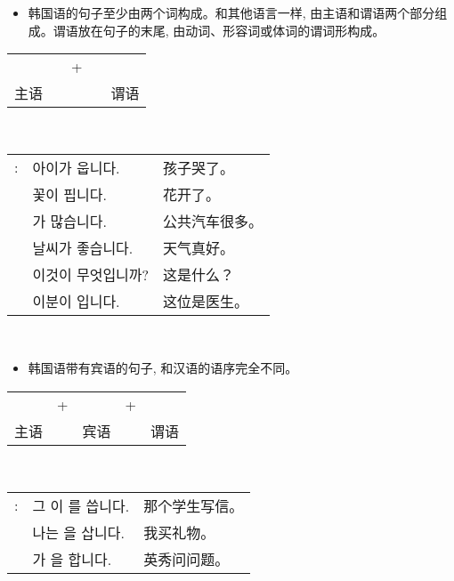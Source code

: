 \begin{grammar}
	\begin{grammarsect}[句子结构]
		\begin{itemize}
			\item 韩国语的句子至少由两个词构成。和其他语言一样, 由主语和谓语两个部分组成。谓语放在句子的末尾, 由动词、形容词或体词的谓词形构成。
		\end{itemize}
		\begin{center}
			\begin{tabular}{lllll}
				\kr \ruby{主語}{주어} & \qquad & + & \qquad & \kr \ruby{敍述語}{서술어} \\
				主语                & \qquad &   & \qquad & 谓语
			\end{tabular}\\
		\end{center}
		\begin{tabular}{lll}
			\kr \ruby{例}{예}: & \kr 아이가 웁니다.              & 孩子哭了。   \\
			                 & \kr 꽃이 핍니다.               & 花开了。    \\
			                 & \kr \ruby{버스}{bus}가 많습니다. & 公共汽车很多。 \\
			                 & \kr 날씨가 좋습니다.             & 天气真好。   \\
			                 & \kr 이것이 무엇입니까?            & 这是什么？   \\
			                 & \kr 이분이 \ruby{醫師}{의사}입니다. & 这位是医生。
		\end{tabular}\\
	\end{grammarsect}
	\begin{itemize}
		\item 韩国语带有宾语的句子, 和汉语的语序完全不同。
	\end{itemize}
	\begin{center}
		\begin{tabular}{lllll}
			\kr \ruby{主語}{주어} & + & \kr \ruby{目的語}{목적어} & + & \kr \ruby{敍述語}{서술어} \\
			主语                &   & 宾语                  &   & 谓语
		\end{tabular}\\
	\end{center}
	\begin{tabular}{lll}
		\kr \ruby{例}{예}: & \kr 그 \ruby{學生}{학생}이 \ruby{便紙}{편지}를 씁니다. & 那个学生写信。 \\
		                 & \kr 나는 \ruby{膳物}{선물}을 삽니다.               & 我买礼物。   \\
		                 & \kr \ruby{英秀}{영수}가 \ruby{質問}{질문}을 합니다.   & 英秀问问题。
	\end{tabular}\\
\end{grammar}
